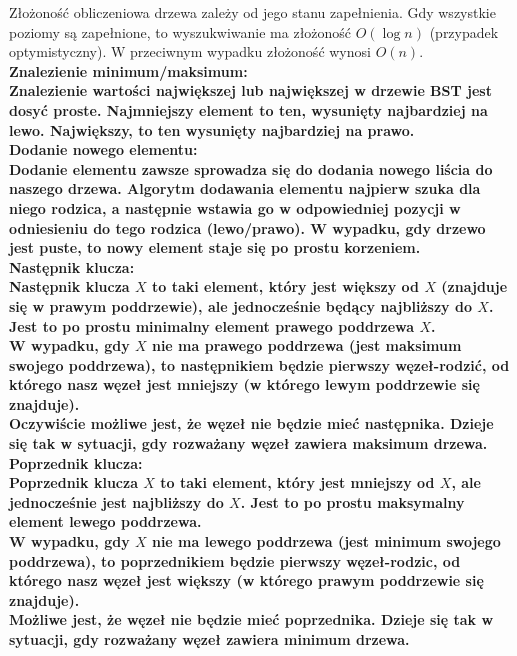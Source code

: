 \documentclass[a4paper,12pt]{article}
\newcommand{\h}[1]{\noindent \bf #1 \rm \\ \noindent}
\begin{document}
\noindent
Złożoność obliczeniowa drzewa zależy od jego stanu zapełnienia. Gdy wszystkie poziomy są zapełnione, to wyszukwiwanie ma złożoność $O(\log n)$ (przypadek optymistyczny). W przeciwnym wypadku złożoność wynosi $O(n)$. \\

\h{Znalezienie minimum/maksimum:}
Znalezienie wartości największej lub największej w drzewie BST jest dosyć proste. Najmniejszy element to ten, wysunięty najbardziej na lewo. Największy, to ten wysunięty najbardziej na prawo.\\

\h{Dodanie nowego elementu:}
Dodanie elementu zawsze sprowadza się do dodania nowego liścia do naszego drzewa. Algorytm dodawania elementu najpierw szuka dla niego rodzica, a następnie wstawia go w odpowiedniej pozycji w odniesieniu do tego rodzica (lewo/prawo). W wypadku, gdy drzewo jest puste, to nowy element staje się po prostu korzeniem.\\

\h{Następnik klucza:}
Następnik klucza $X$ to taki element, który jest większy od $X$ (znajduje się w prawym poddrzewie), ale jednocześnie będący najbliższy do $X$. Jest to po prostu minimalny element prawego poddrzewa $X$.\\

\noindent
W wypadku, gdy $X$ nie ma prawego poddrzewa (jest maksimum swojego poddrzewa), to następnikiem będzie pierwszy węzeł-rodzić, od którego nasz węzeł jest mniejszy (w którego lewym poddrzewie się znajduje).\\

\noindent
Oczywiście możliwe jest, że węzeł nie będzie mieć następnika. Dzieje się tak w sytuacji, gdy rozważany węzeł zawiera maksimum drzewa.\\

\newpage
\h{Poprzednik klucza:}
Poprzednik klucza $X$ to taki element, który jest mniejszy od $X$, ale jednocześnie jest najbliższy do $X$. Jest to po prostu maksymalny element lewego poddrzewa.\\

\noindent
W wypadku, gdy $X$ nie ma lewego poddrzewa (jest minimum swojego poddrzewa), to poprzednikiem będzie pierwszy węzeł-rodzic, od którego nasz węzeł jest większy (w którego prawym poddrzewie się znajduje).\\

\noindent
Możliwe jest, że węzeł nie będzie mieć poprzednika. Dzieje się tak w sytuacji, gdy rozważany węzeł zawiera minimum drzewa.\\
\end{document}
